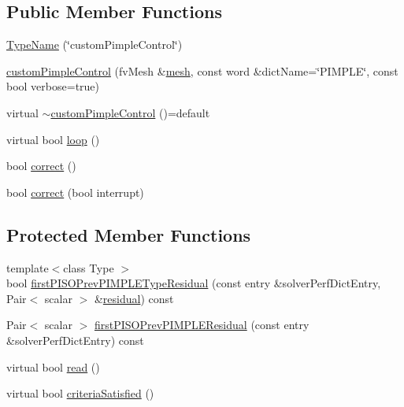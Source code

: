 \subsection*{Public Member Functions}
\begin{DoxyCompactItemize}
\item 
\hyperlink{classFoam_1_1customPimpleControl_a36146f059d764f9b7211b34185d8452d}{Type\+Name} (\char`\"{}custom\+Pimple\+Control\char`\"{})
\item 
\hyperlink{classFoam_1_1customPimpleControl_a7bbdf61c5ddf2a79f9c01202bbd4796d}{custom\+Pimple\+Control} (fv\+Mesh \&\hyperlink{createMeshesPostProcess_8H_a8bb1e58291d2d2b653e024a4f4bffe38}{mesh}, const word \&dict\+Name=\char`\"{}P\+I\+M\+P\+LE\char`\"{}, const bool verbose=true)
\item 
virtual \hyperlink{classFoam_1_1customPimpleControl_a72d00660956037b3d35bae4bdffa07f2}{$\sim$custom\+Pimple\+Control} ()=default
\item 
virtual bool \hyperlink{classFoam_1_1customPimpleControl_adf77b77054c2d4c23b70556fe767f23e}{loop} ()
\item 
bool \hyperlink{classFoam_1_1customPimpleControl_a964daab2755d32e82bff1b36c0a26e90}{correct} ()
\item 
bool \hyperlink{classFoam_1_1customPimpleControl_a8f41ad27de4869bb2784760729933b92}{correct} (bool interrupt)
\end{DoxyCompactItemize}
\subsection*{Protected Member Functions}
\begin{DoxyCompactItemize}
\item 
{\footnotesize template$<$class Type $>$ }\\bool \hyperlink{classFoam_1_1customPimpleControl_a7d9d20b533298b951b3a704c4b521bcc}{first\+P\+I\+S\+O\+Prev\+P\+I\+M\+P\+L\+E\+Type\+Residual} (const entry \&solver\+Perf\+Dict\+Entry, Pair$<$ scalar $>$ \&\hyperlink{solveThermalMechanics_8H_a840cf6bbf9aacf15bd364b478394c3a7}{residual}) const
\item 
Pair$<$ scalar $>$ \hyperlink{classFoam_1_1customPimpleControl_a898809a3fa697a2760eb2286f5215b82}{first\+P\+I\+S\+O\+Prev\+P\+I\+M\+P\+L\+E\+Residual} (const entry \&solver\+Perf\+Dict\+Entry) const
\item 
virtual bool \hyperlink{classFoam_1_1customPimpleControl_af816873151ddb0126e98bb2f914d8ed5}{read} ()
\item 
virtual bool \hyperlink{classFoam_1_1customPimpleControl_a2ccaff4c460a7c2f5a7ed00ac8aec76d}{criteria\+Satisfied} ()
\end{DoxyCompactItemize}
